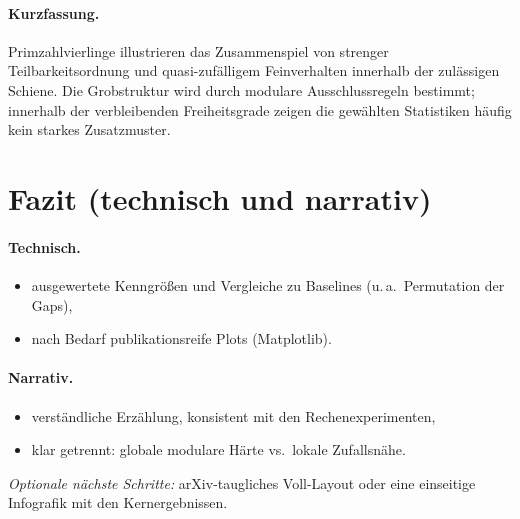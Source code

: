 \documentclass[11pt,a4paper]{article}
\begin{document}
\paragraph{Kurzfassung.}
Primzahlvierlinge illustrieren das Zusammenspiel von strenger Teilbarkeitsordnung und quasi-zufälligem Feinverhalten innerhalb der zulässigen Schiene. Die Grobstruktur wird durch modulare Ausschlussregeln bestimmt; innerhalb der verbleibenden Freiheitsgrade zeigen die gewählten Statistiken häufig kein starkes Zusatzmuster.

\section{Fazit (technisch und narrativ)}

\paragraph{Technisch.}
\begin{itemize}
  \item ausgewertete Kenngrößen und Vergleiche zu Baselines (u.\,a.\ Permutation der Gaps),
  \item nach Bedarf publikationsreife Plots (Matplotlib).
\end{itemize}

\paragraph{Narrativ.}
\begin{itemize}
  \item verständliche Erzählung, konsistent mit den Rechenexperimenten,
  \item klar getrennt: globale modulare Härte vs.\ lokale Zufallsnähe.
\end{itemize}

\medskip
\noindent\textit{Optionale nächste Schritte:} arXiv-taugliches Voll-Layout oder eine einseitige Infografik mit den Kernergebnissen.
\end{document}
